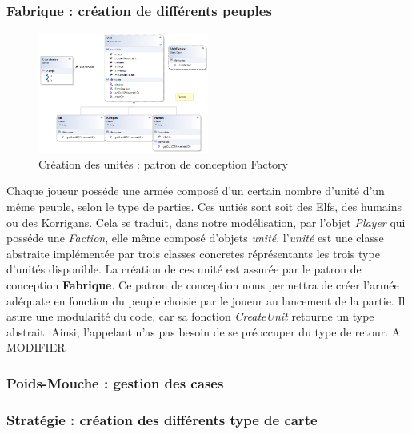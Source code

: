 		\subsubsection{Fabrique : création de différents peuples}

		\begin{figure}[h]
			\begin{center}
				\includegraphics[width=0.5\textwidth]{figure/factory.png}
			\end{center}
			\caption{Création des unités : patron de conception Factory}
			\label{fig:strategy}
		\end{figure}

		Chaque joueur posséde une armée composé d'un certain nombre d'unité d'un même peuple, selon le type de parties. Ces untiés sont soit des Elfs, des humains ou des Korrigans. Cela se traduit, dans notre modélisation, par l'objet \emph{Player} qui posséde une \emph{Faction}, elle même composé d'objets \emph{unité}. l'\emph{unité} est une classe abstraite implémentée par trois classes concretes réprésentants les trois type d'unités disponible. La création de ces unité est assurée par le patron de conception \textbf{Fabrique}. Ce patron de conception nous permettra de créer l'armée adéquate en fonction du peuple choisie par le joueur au lancement de la partie. Il asure une modularité du code, car sa fonction \emph{CreateUnit} retourne un type abstrait. Ainsi, l'appelant n'as pas besoin de se préoccuper du type de retour.  A MODIFIER



		\subsubsection{Poids-Mouche : gestion des cases}

		\subsubsection{Stratégie : création des différents type de carte}



